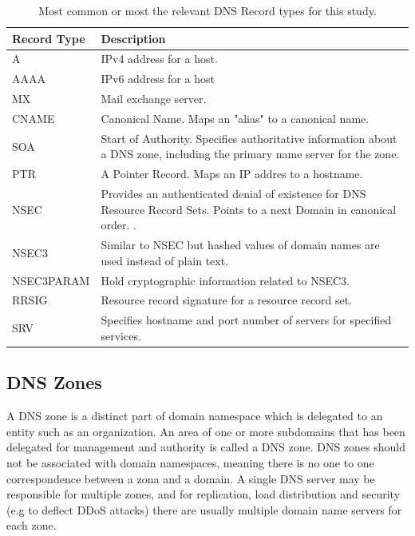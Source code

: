 \begin{table}[th]
\caption{Most common or most the relevant DNS Record types for this study.}
\label{table:dns_record_types}
\begin{center}
\begin{tabular}{|p{}|p{}|} 
    \hline
Record Type & Description \\
    \hline
    \hline
A & IPv4 address for a host. \cite{RFC1035}\\ 
    \hline
AAAA & IPv6 address for a host \cite{RFC3596}\\
    \hline
MX & Mail exchange server. \cite{RFC1035} \\
    \hline
CNAME & Canonical Name. Maps an "alias" to a canonical name. \cite{RFC1035} \\
    \hline
SOA & Start of Authority. Specifies authoritative information about a DNS zone, including the primary name server for the zone. \cite{RFC1035}\\    \hline
PTR & A Pointer Record. Maps an IP addres to a hostname. \cite{RFC1035} \\
    \hline
    
NSEC & Provides an authenticated denial of
   existence for DNS Resource Record Sets. Points to a next Domain in canonical order. \cite{RFC3845}. 
\\
\hline
NSEC3 & Similar to NSEC but hashed values of domain names are used instead of plain text.\cite{RFC5155} \\
\hline

NSEC3PARAM & Hold cryptographic information related to NSEC3. \cite{RFC5155}\\
\hline

RRSIG & Resource record signature for a resource record set. \cite{RFC4034}\\
\hline

SRV & Specifies hostname and port number of servers for specified services. \cite{RFC2782}\\
\hline


\end{tabular}
\end{center}
\end{table}


\subsection{DNS Zones}
\label{sec:dns_zones}

A DNS zone is a distinct part of domain namespace which is delegated to an entity such as an organization. An area of one or more subdomains that has been delegated for management and authority is called a DNS zone. DNS zones should not be associated with domain namespaces, meaning there is no one to one correspondence between a zona and a domain. A single DNS server may be responsible for multiple zones, and for replication, load distribution and security (e.g to deflect DDoS attacks) there are usually multiple domain name servers for each zone.\citep{tanenbaum}

